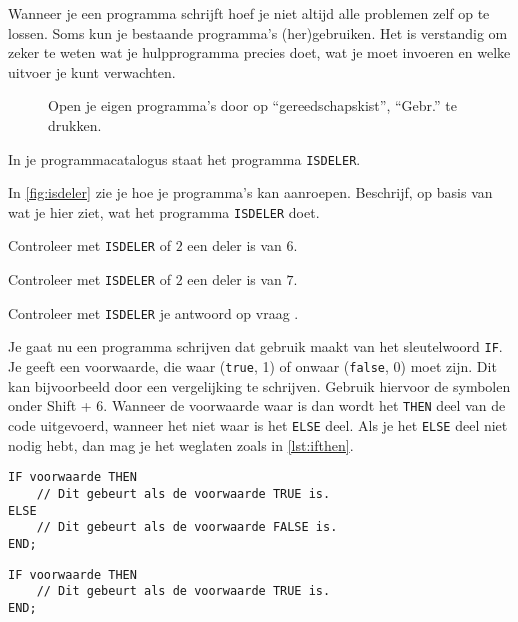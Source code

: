 

Wanneer je een programma schrijft hoef je niet altijd alle problemen zelf op te lossen.
Soms kun je bestaande programma's (her)gebruiken.
Het is verstandig om zeker te weten wat je hulpprogramma precies doet, wat je moet invoeren en welke uitvoer je kunt verwachten.

\begin{figure}[htbp]
	\begin{center}
		\caption{Open je eigen programma's door op ``gereedschapskist'', ``Gebr.'' te drukken.}
		\label{fig:isdeler}
	\end{center}
\end{figure}


\opdracht[1] In je programmacatalogus staat het programma \texttt{ISDELER}.

	\? In \autoref{fig:isdeler} zie je hoe je programma's kan aanroepen. Beschrijf, op basis van wat je hier ziet, wat het programma \texttt{ISDELER} doet.
	
	\? Controleer met \texttt{ISDELER} of $2$ een deler is van $6$.
	
	\? Controleer met \texttt{ISDELER} of $2$ een deler is van $7$.
	
	\? Controleer met \texttt{ISDELER} je antwoord op vraag .
\bigskip

Je gaat nu een programma schrijven dat gebruik maakt van het sleutelwoord \lstinline|IF|.
Je geeft een voorwaarde, die waar (\lstinline|true|, 1) of onwaar (\lstinline|false|, 0) moet zijn.
Dit kan bijvoorbeeld door een vergelijking te schrijven. Gebruik hiervoor de symbolen onder Shift + 6.
Wanneer de voorwaarde waar is dan wordt het \lstinline|THEN| deel van de code uitgevoerd, wanneer het niet waar is het \lstinline|ELSE| deel.
Als je het \lstinline|ELSE| deel niet nodig hebt, dan mag je het weglaten zoals in \autoref{lst:ifthen}.

\begin{lstlisting}[float=h, caption={IF-THEN-ELSE}, label={lst:ifthenelse}]
IF voorwaarde THEN
	// Dit gebeurt als de voorwaarde TRUE is.
ELSE
	// Dit gebeurt als de voorwaarde FALSE is.
END;
\end{lstlisting}

\begin{lstlisting}[float=h, caption={IF-THEN}, label={lst:ifthen}]
IF voorwaarde THEN
	// Dit gebeurt als de voorwaarde TRUE is.
END;
\end{lstlisting}

